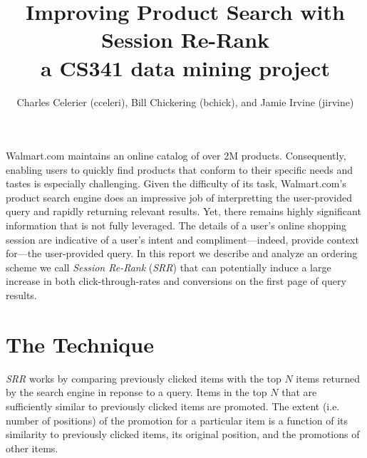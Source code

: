 \documentclass{article}
\title{Improving Product Search with Session Re-Rank\\
    \large{a CS341 data mining project}}
\author{Charles Celerier (cceleri), Bill Chickering (bchick),
        and Jamie Irvine (jirvine)}
\begin{document}
\maketitle

Walmart.com maintains an online catalog of over 2M products. Consequently,
enabling users to quickly find products that conform to their specific needs and
tastes is especially challenging. Given the difficulty of its task,
Walmart.com's product search engine does an impressive job of interpretting the
user-provided query and rapidly returning relevant results. Yet, there remains
highly significant information that is not fully leveraged. The details of a
user's online shopping session are indicative of a user's intent and
compliment---indeed, provide context for---the user-provided query. In this
report we describe and analyze an ordering scheme we call {\em Session Re-Rank}
({\em SRR}) that can potentially induce a large increase in both
click-through-rates and conversions on the first page of query results.

\section{The Technique}\label{sec:technique}

{\em SRR} works by comparing previously clicked items with the top $N$ items
returned by the search engine in reponse to a query. Items in the top $N$ that
are sufficiently similar to previously clicked items are promoted. The extent
(i.e. number of positions) of the promotion for a particular item is a function
of its similarity to previously clicked items, its original position, and the
promotions of other items.
\end{document}
